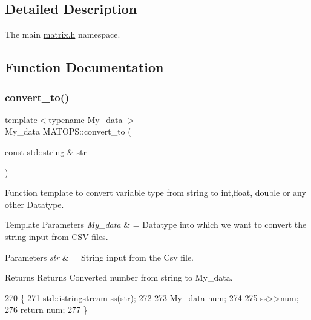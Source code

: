 \subsection{Detailed Description}
The main \hyperlink{matrix_8h}{matrix.\+h} namespace. 

\subsection{Function Documentation}
\mbox{\label{namespaceMATOPS_a058c07f65db98cd52617d3d5c4de3b42}} 
\subsubsection{\texorpdfstring{convert\+\_\+to()}{convert\_to()}}
{\footnotesize\ttfamily template$<$typename My\+\_\+data $>$ \\
My\+\_\+data M\+A\+T\+O\+P\+S\+::convert\+\_\+to (\begin{DoxyParamCaption}\item[{const std\+::string \&}]{str }\end{DoxyParamCaption})}



Function template to convert variable type from string to int,float, double or any other Datatype. 


\begin{DoxyTemplParams}{Template Parameters}
{\em My\+\_\+data} & = Datatype into which we want to convert the string input from C\+SV files. \\
\hline
\end{DoxyTemplParams}

\begin{DoxyParams}{Parameters}
{\em str} & = String input from the Csv file. \\
\hline
\end{DoxyParams}
\begin{DoxyReturn}{Returns}
Returns Converted number from string to My\+\_\+data. 
\end{DoxyReturn}

\begin{DoxyCode}
270                         \{
271                                 std::istringstream ss(str);
272 
273                                 My\_data num;
274 
275                                 ss>>num;
276                                 \textcolor{keywordflow}{return} num;
277                         \}
\end{DoxyCode}
\mbox{\label{namespaceMATOPS_a2050c01cf601a211d3abc45515b8749d}} 
